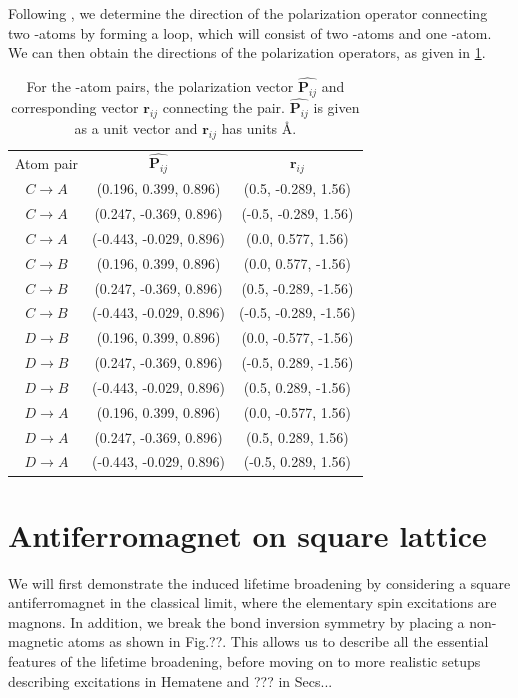 Following \textcite{zhuSpinorbitCouplingElectronic2014}, we determine the direction of the polarization operator connecting two -atoms by forming a loop, which will consist of two -atoms and one -atom. We can then obtain the directions of the polarization operators, as given in \cref{tab:polarization-hematene}.
\begin{table}[]
	\centering
	\begin{tabular}{ccc}
		Atom pair & $\hat{\bm P_{ij}}$ & $\bm r_{ij}$ \\
		$C\rightarrow A$ & (0.196, 0.399, 0.896) & (0.5, -0.289, 1.56)\\ 
		$C\rightarrow A$ & (0.247, -0.369, 0.896) & (-0.5, -0.289, 1.56)\\ 
		$C\rightarrow A$ & (-0.443, -0.029, 0.896) & (0.0, 0.577, 1.56)\\ 
		$C\rightarrow B$ & (0.196, 0.399, 0.896) & (0.0, 0.577, -1.56)\\ 
		$C\rightarrow B$ & (0.247, -0.369, 0.896) & (0.5, -0.289, -1.56)\\ 
		$C\rightarrow B$ & (-0.443, -0.029, 0.896) & (-0.5, -0.289, -1.56)\\ 
		$D\rightarrow B$ & (0.196, 0.399, 0.896) & (0.0, -0.577, -1.56)\\ 
		$D\rightarrow B$ & (0.247, -0.369, 0.896) & (-0.5, 0.289, -1.56)\\ 
		$D\rightarrow B$ & (-0.443, -0.029, 0.896) & (0.5, 0.289, -1.56)\\ 
		$D\rightarrow A$ & (0.196, 0.399, 0.896) & (0.0, -0.577, 1.56)\\ 
		$D\rightarrow A$ & (0.247, -0.369, 0.896) & (0.5, 0.289, 1.56)\\ 
		$D\rightarrow A$ & (-0.443, -0.029, 0.896) & (-0.5, 0.289, 1.56)\\ 
	\end{tabular}
	\caption{For the -atom pairs, the polarization vector $\hat{\bm P_{ij}}$ and corresponding vector $\bm r_{ij}$ connecting the pair. $\hat{\bm P_{ij}}$ is given as a unit vector and $\bm r_{ij}$ has units \si{\AA}.}
	\label{tab:polarization-hematene}
\end{table}

\section{Antiferromagnet on square lattice}
We will first demonstrate the induced lifetime broadening by considering a square antiferromagnet in the classical limit, where the elementary spin excitations are magnons. In addition, we break the bond inversion symmetry by placing a non-magnetic atoms as shown in Fig.??. This allows us to describe all the essential features of the lifetime broadening, before moving on to more realistic setups describing excitations in Hematene and ??? in Secs...




